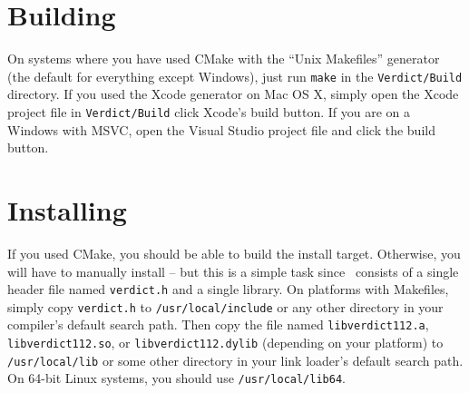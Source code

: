 \section{Building \verd}

On systems where you have used CMake with the ``Unix Makefiles'' generator (the default for everything except Windows),
just run \texttt{make} in the \texttt{Verdict/Build} directory.
If you used the Xcode generator on Mac OS X, simply open the Xcode project file in \texttt{Verdict/Build}
click Xcode's build button.
If you are on a Windows with MSVC, open the Visual Studio project file and click the build button.

\section{Installing \verd}

If you used CMake, you should be able to build the install target.
Otherwise, you will have to manually install \verd -- but this is a simple task since
\verd\ consists of a single header file named \texttt{verdict.h} and a single library.
On platforms with Makefiles, simply copy \texttt{verdict.h} to \texttt{/usr/local/include} or
any other directory in your compiler's default search path.
Then copy the file named \texttt{libverdict112.a}, \texttt{libverdict112.so}, or \texttt{libverdict112.dylib}
(depending on your platform) to \texttt{/usr/local/lib} or some other directory in your
link loader's default search path. On 64-bit Linux systems, you should use \texttt{/usr/local/lib64}.

